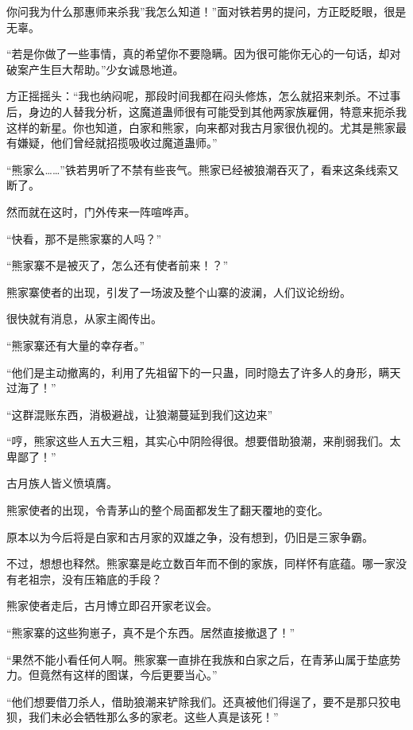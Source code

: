 
\begin{this_body}

你问我为什么那惠师来杀我”我怎么知道！”面对铁若男的提问，方正眨眨眼，很是无辜。

“若是你做了一些事情，真的希望你不要隐瞒。因为很可能你无心的一句话，却对破案产生巨大帮助。”少女诚恳地道。

方正摇摇头：“我也纳闷呢，那段时间我都在闷头修炼，怎么就招来刺杀。不过事后，身边的人替我分析，这魔道蛊师很有可能受到其他两家族雇佣，特意来扼杀我这样的新星。你也知道，白家和熊家，向来都对我古月家很仇视的。尤其是熊家最有嫌疑，他们曾经就招揽吸收过魔道蛊师。”

“熊家么……”铁若男听了不禁有些丧气。熊家已经被狼潮吞灭了，看来这条线索又断了。

然而就在这时，门外传来一阵喧哗声。

“快看，那不是熊家寨的人吗？”

“熊家寨不是被灭了，怎么还有使者前来！？”

熊家寨使者的出现，引发了一场波及整个山寨的波澜，人们议论纷纷。

很快就有消息，从家主阁传出。

“熊家寨还有大量的幸存者。”

“他们是主动撤离的，利用了先祖留下的一只蛊，同时隐去了许多人的身形，瞒天过海了！”

“这群混账东西，消极避战，让狼潮蔓延到我们这边来”

“哼，熊家这些人五大三粗，其实心中阴险得很。想要借助狼潮，来削弱我们。太卑鄙了！”

古月族人皆义愤填膺。

熊家使者的出现，令青茅山的整个局面都发生了翻天覆地的变化。

原本以为今后将是白家和古月家的双雄之争，没有想到，仍旧是三家争霸。

不过，想想也释然。熊家寨是屹立数百年而不倒的家族，同样怀有底蕴。哪一家没有老祖宗，没有压箱底的手段？

熊家使者走后，古月博立即召开家老议会。

“熊家寨的这些狗崽子，真不是个东西。居然直接撤退了！”

“果然不能小看任何人啊。熊家寨一直排在我族和白家之后，在青茅山属于垫底势力。但竟然有这样的图谋，今后更要当心。”

“他们想要借刀杀人，借助狼潮来铲除我们。还真被他们得逞了，要不是那只狡电狈，我们未必会牺牲那么多的家老。这些人真是该死！”


\end{this_body}
